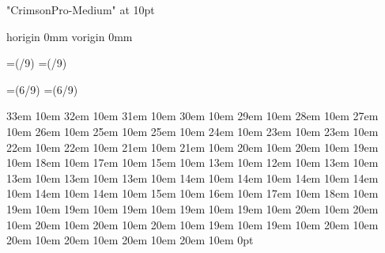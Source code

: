 %
\initunifonts

\font\crimten "CrimsonPro-Medium" at 10pt\crimten

\baselineskip=10pt
\lineskiplimit=-1000pt
\lineskip=0pt

\parskip=0pt
\parindent=0pt
\frenchspacing

\pagewidth=210mm
\pageheight=297mm

\pdfvariable horigin 0mm
\pdfvariable vorigin 0mm

\hoffset=\dimexpr(\pagewidth/9)\relax
\voffset=\dimexpr(\pageheight/9)\relax

\hsize=\dimexpr(6\pagewidth/9)\relax
\vsize=\dimexpr(6\pageheight/9)\relax

%

\pgbackground{}


	33em 10em
	32em 10em
	31em 10em
	30em 10em
	29em 10em
	28em 10em
	27em 10em
	26em 10em
	25em 10em
	25em 10em
	24em 10em
	23em 10em
	23em 10em
	22em 10em
	22em 10em
	21em 10em
	21em 10em
	20em 10em
	20em 10em
	19em 10em	
	18em 10em
	17em 10em
	15em 10em
	13em 10em
	12em 10em %
	13em 10em
	13em 10em
	13em 10em
	13em 10em
	14em 10em
	14em 10em
	14em 10em
	14em 10em
	14em 10em
	14em 10em
	15em 10em
	16em 10em
	17em 10em
	18em 10em
	19em 10em
	19em 10em
	19em 10em
	19em 10em
	19em 10em
	20em 10em
	20em 10em
	20em 10em
	20em 10em
	20em 10em
	19em 10em
	19em 10em
	20em 10em
	20em 10em
	20em 10em
	20em 10em
	20em 10em
	0pt \hsize


\bye
